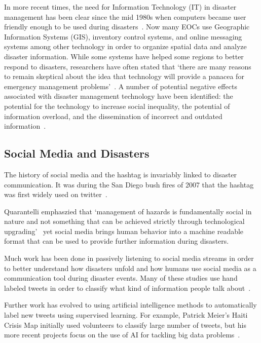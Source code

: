 In more recent times, the need for Information Technology (IT) in disaster
management has been clear since the mid 1980s when computers became user
friendly enough to be used during
disasters~\cite{universityTerminalDisastersComputer1986}. Now many EOCs use
Geographic Information Systems (GIS), inventory control systems, and online
messaging systems among other technology in order to organize spatial data and
analyze disaster information. While some systems have helped some regions to
better respond to disasters, researchers have often stated that `there
are many reasons to remain skeptical about the idea that technology will provide
a panacea for emergency management problems'~\cite{tzemosUseGISFederal1995,
tierneyFacingUnexpectedDisaster2001, perryNaturalDisasterManagement2007}. A
number of potential negative effects associated with disaster management
technology have been identified: the potential for the technology to increase
social inequality, the potential of information overload, and the dissemination
of incorrect and outdated information~\cite{quarantelliProblematicalAspectsInformation1997,
flentgeDesigningContextAwareHCI}.

\subsection{Social Media and Disasters}
The history of social media and the
hashtag is invariably linked to disaster communication.  It was during the San
Diego bush fires of 2007 that the hashtag was first widely used on
twitter~\cite{salazarHashtagsAnnotatedHistory2017}.

Quarantelli emphaszied that  `management of hazards is fundamentally social in
nature and not something that can be achieved strictly through technological
upgrading'~\cite{tierneyFacingUnexpectedDisaster2001} yet social media brings
human behavior into a machine readable format that can be used to provide
further information during disasters.

Much work has been done in passively listening to social media streams
in order to better understand how disasters unfold and how humans use
social media as a communication tool during disaster events. Many of
these studies use hand labeled tweets in order to classify what kind of
information people talk about~\cite{alamTwitterTaleThree2018}.

Further work has evolved to using artificial intelligence methods to
automatically label new tweets using supervised learning. For example, Patrick
Meier's Haiti Crisis Map initially used volunteers to classify large number of
tweets, but his more recent projects focus on the use of AI for tackling big
data problems~\cite{meierDigitalHumanitariansHow2015}.
